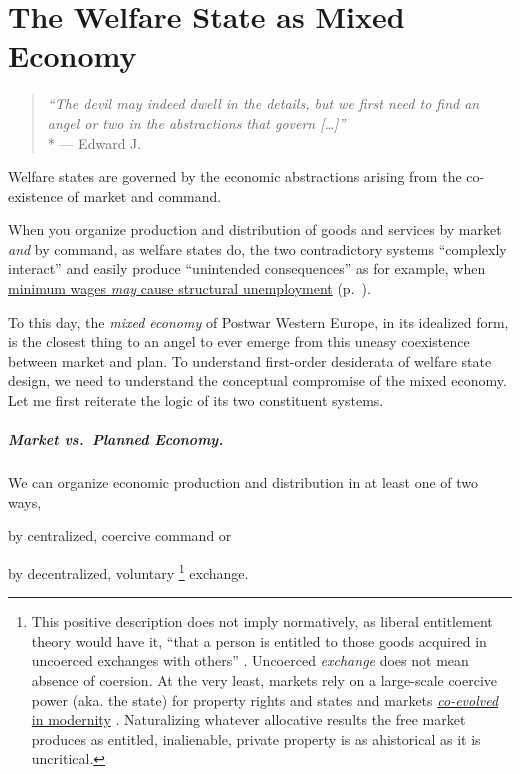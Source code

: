 
\chapter[Mixed Economy]{The Welfare State as Mixed Economy} \label{chap:mixed-economy}

\begin{quote}
	\emph{``The devil may indeed dwell in the details, but we first need to find an angel or two in the abstractions that govern [\ldots]''}\\*
	--- Edward J.~\cite[K117]{McCaffery2002}
\end{quote}

Welfare states are governed by the economic abstractions arising from the co-existence of market and command.

When you organize production and distribution of goods and services by market \emph{and} by command, as welfare states do, the two contradictory systems ``complexly interact'' \citep{Perrow-1999-aa} and easily produce ``unintended consequences'' \citep{Merton-1936-aa} as for example, when \hyperref[sec:price-floors]{minimum wages \emph{may} cause structural unemployment} (p.~\pageref{sec:price-floors}).

To this day, the \emph{mixed economy} of Postwar Western Europe, in its idealized form, is the closest thing to an angel to ever emerge from this uneasy coexistence between market and plan.
To understand first-order desiderata of welfare state design, we need to understand the conceptual compromise of the mixed economy.
Let me first reiterate the logic of its two constituent systems.

\paragraph[Market vs.\ Plan]{Market vs.\ Planned Economy.}  \label{sec:market-vs-command}

We can organize economic production and distribution in at least one of two ways,
\begin{inparaenum}
	\item
		by centralized, coercive command or
	\item
		by decentralized, voluntary
		\footnote{
			\label{fn:tilly} This positive description does not imply normatively, as liberal entitlement theory would have it, ``that a person is entitled to those goods acquired in uncoerced exchanges with others'' \citep[149]{Nozick1974,Friedman1962}.
			Uncoerced \emph{exchange} does not mean absence of coersion.
			At the very least, markets rely on a large-scale coercive power (aka. the state) for property rights and states and markets \hyperref[sec:modernity]{\emph{co-evolved} in modernity} \citep{Tilly-1985-aa}.
			Naturalizing whatever allocative results the free market produces as entitled, inalienable, private property is as ahistorical as it is uncritical.
		}
		exchange.
\end{inparaenum}

